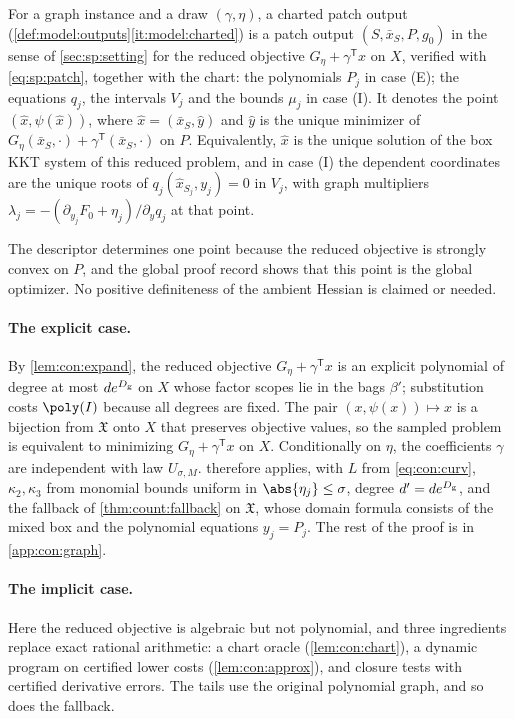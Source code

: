 \begin{definition}\label{def:con:charted}
For a graph instance and a draw $(\gamma,\eta)$, a charted patch output
(\cref{def:model:outputs}\ref{it:model:charted}) is a
patch output $(S,\bar x_S,P,g_0)$ in the sense of \cref{sec:sp:setting} for
the reduced objective $G_\eta+\gamma^{\mathsf T}x$ on $X$, verified with
\eqref{eq:sp:patch}, together with the chart: the polynomials $P_j$ in case
(E); the equations $q_j$, the intervals $V_j$ and the bounds $\mu_j$ in case
(I). It denotes the point $(\hat x,\psi(\hat x))$, where $\hat x=(\bar x_S,
\hat y)$ and $\hat y$ is the unique minimizer of $G_\eta(\bar x_S,\cdot)+
\gamma^{\mathsf T}(\bar x_S,\cdot)$ on $P$. Equivalently, $\hat x$ is the
unique solution of the box KKT system of this reduced problem, and in case
(I) the dependent coordinates are the unique roots of $q_j(\hat x_{S_j},y_j)=0$
in $V_j$, with graph multipliers
$\lambda_j=-(\partial_{y_j}F_0+\eta_j)/\partial_yq_j$ at that point.
\end{definition}

The descriptor determines one point because the reduced objective is
strongly convex on $P$, and the global proof record shows that this point is
the global optimizer. No positive definiteness of the ambient Hessian is
claimed or needed.

\paragraph{The explicit case.}
By \cref{lem:con:expand}, the reduced objective $G_\eta+\gamma^{\mathsf T}x$
is an explicit polynomial of degree at most $de^{D_{\rm g}}$ on $X$ whose
factor scopes lie in the bags $\beta'$; substitution costs $\poly(I)$ because
all degrees are fixed. The pair $(x,\psi(x))\mapsto x$ is a bijection from
$\mathfrak X$ onto $X$ that preserves objective values, so the sampled problem
is equivalent to minimizing $G_\eta+\gamma^{\mathsf T}x$ on $X$. Conditionally
on $\eta$, the coefficients $\gamma$ are independent with law $U_{\sigma,M}$.
 therefore applies, with $L$ from
\eqref{eq:con:curv}, $\kappa_2,\kappa_3$ from monomial bounds uniform in
$\abs{\eta_j}\le\sigma$, degree $d'=de^{D_{\rm g}}$, and the fallback of
\cref{thm:count:fallback} on $\mathfrak X$, whose domain formula consists of the
mixed box and the polynomial equations $y_j=P_j$. The rest of the proof is in
\cref{app:con:graph}.

\paragraph{The implicit case.}
Here the reduced objective is algebraic but not polynomial, and three
ingredients replace exact rational arithmetic: a chart oracle
(\cref{lem:con:chart}), a dynamic program on certified lower costs
(\cref{lem:con:approx}), and closure tests with certified derivative errors.
The tails use the original polynomial graph, and so does the fallback.

